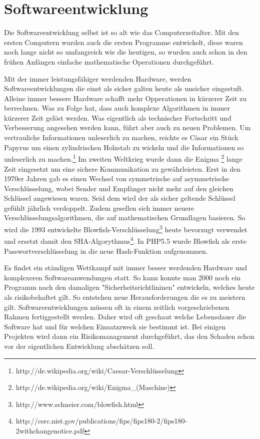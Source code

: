 \section{Softwareentwicklung}

Die Softwareentwicklung selbst ist so alt wie das Computerzeitalter. 
Mit den ersten Computern wurden auch die ersten Programme entwickelt,
diese waren noch lange nicht so umfangreich wie die heutigen, so wurden
auch schon in den frühen Anfängen einfache mathematische Operationen durchgeführt. 

Mit der immer leistungsfähiger werdenden Hardware, werden Softwareentwicklungen
die einst als sicher galten heute als unsicher eingestuft. Alleine immer
bessere Hardware schafft mehr Opperationen in kürzerer Zeit zu berrechnen.
Was zu Folge hat, dass auch komplexe Algorithmen in immer kürzerer Zeit
gelöst werden. Was eigentlich als technischer Fortschritt und Verbesserung 
angesehen werden kann, führt aber auch zu neuen Problemen.
Um vertrauliche Informationen unleserlich zu machen, reichte es Cäsar 
ein Stück Papyrus um einen zylindrischen Holzstab zu wickeln und die 
Informationen so unleserlich zu machen.\footnote{http://de.wikipedia.org/wiki/Caesar-Verschlüsselung} 
Im zweiten Weltkrieg wurde dann die Enigma \footnote{http://de.wikipedia.org/wiki/Enigma_(Maschine)} 
lange Zeit eingesetzt um eine sichere Kommunikation zu gewährleisten. 
Erst in den 1970er Jahren gab es einen Wechsel von symmetrische auf 
asymmetrische Verschlüsselung, wobei Sender und Empfänger nicht mehr auf 
den gleichen Schlüssel angewiesen waren. Seid dem wird der als sicher
geltende Schlüssel gefühlt jährlich verdoppelt. Zudem gesellen sich immer
neuere Verschlüsselungsalgorithmen, die auf mathematischen Grundlagen basieren. 
So wird die 1993 entwickelte Blowfish-Verschlüsselung\footnote{http://www.schneier.com/blowfish.html}
heute bevorzugt verwendet und ersetzt damit den SHA-Algorythmus\footnote{http://csrc.nist.gov/publications/fips/fips180-2/fips180-2withchangenotice.pdf}. 
In PHP5.5 wurde Blowfish als erste Passwortverschlüsselung in die neue
Hash-Funktion aufgenommen.  

Es findet ein ständigen Wettkampf mit immer besser werdenden
Hardware und komplexeren Softwareanwendungen statt. So kann konnte man 
2000 noch ein Programm nach den damaligen "Sicherheitsrichtlininen" 
entwickeln, welches heute als risikobehaftet gilt. So entstehen 
neue Herausforderungen die es zu meistern gilt. 
Softwareentwicklungen müssen oft in einem zeitlich vorgeschriebenen 
Rahmen fertiggestellt werden. Daher wird oft geschaut welche Lebensdauer 
die Software hat und für welchen Einsatzzweck sie bestimmt ist. Bei einigen
Projekten wird dann ein Risikomanagement durchgeführt, das den 
Schaden schon vor der eigentlichen Entwicklung abschätzen soll.

